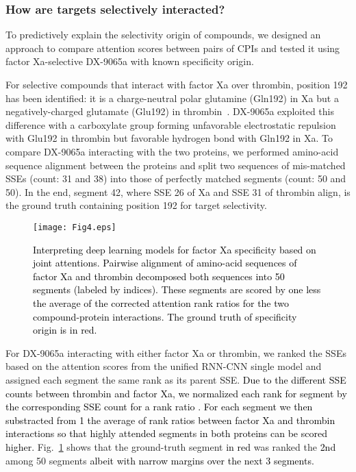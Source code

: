 \documentclass[nocrop]{bioinfo}
\newcommand{\red}[1]{\textcolor{black}{#1}}
\begin{document}
\subsubsection{How are targets selectively interacted?}
To predictively explain the selectivity origin of compounds, we designed an approach to compare attention scores between pairs of CPIs and tested it using factor Xa-selective DX-9065a with known specificity origin. 

For selective compounds that interact with factor Xa over thrombin, position 192 has been identified: it is a charge-neutral polar glutamine  (Gln192) in Xa but a negatively-charged glutamate  (Glu192) in thrombin~\citep{huggins2012rational}. DX-9065a exploited this difference with a carboxylate group forming unfavorable electrostatic repulsion with Glu192 in thrombin but favorable hydrogen bond with Gln192 in Xa.  To compare DX-9065a interacting with the two proteins, we performed amino-acid sequence alignment between the proteins and split two sequences of mis-matched SSEs  (count: 31 and 38) into those of perfectly matched segments  (count: 50 and 50). In the end, segment 42, where SSE 26 of Xa and SSE 31 of thrombin align,  is the ground truth containing position 192 for target selectivity.

\begin{figure}[!htb]
    \centering
    \texttt{[image: Fig4.eps]}
\caption{\red{Interpreting deep learning models for factor Xa specificity based on joint attentions.  Pairwise alignment of amino-acid sequences of factor Xa and thrombin decomposed both sequences into 50 segments  (labeled by indices).  These segments are scored by one less the average of the corrected attention rank ratios for the two compound-protein interactions. The ground truth of specificity origin is in red.}} \vspace{-1em}
    \label{fig:factorXa_spec}
\end{figure}

For DX-9065a interacting with either factor Xa or thrombin, we ranked the SSEs based on the attention scores from the unified RNN-CNN single model and assigned each segment the same rank as its parent SSE. \red{Due to the different SSE counts between thrombin and factor Xa, we normalized each rank for segment  by the corresponding SSE count for a rank ratio . For each segment we then substracted from 1 the average of rank ratios between factor Xa and thrombin interactions so that highly attended segments in both proteins can be scored higher.} Fig.~\ref{fig:factorXa_spec} shows that the ground-truth segment \red{in red} was ranked the \red{2nd} among 50 segments \red{albeit with narrow margins over the next 3 segments.} 
\end{document}
